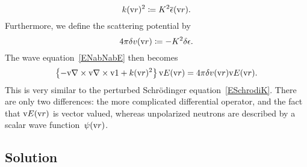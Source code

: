 \begin{equation}
  k(\text{v}{r})^2 \coloneqq K^2 \overline{\epsilon}(\text{v}{r}).
\end{equation}
Furthermore, we define the scattering potential by
%
\begin{equation}
  4\pi\delta v(\text{v}{r}) \coloneqq - K^2\delta\epsilon.
\end{equation}
The wave equation~\cref{ENabNabE} then becomes
\begin{equation}\label{EwaveE3}
  \left\{-\text{v}{\nabla}\times\text{v}{\nabla}\times\text{v}{1} + k(\text{v}{r})^2\right\}\text{v}{E}(\text{v}{r})
  = 4\pi\delta v(\text{v}{r})\text{v}{E}(\text{v}{r}).
\end{equation}
%
%
This is very similar to the perturbed Schrödinger equation~\cref{ESchrodiK}.
%
There are only two differences:
the more complicated differential operator,
and the fact that $\text{v}{E}(\text{v}{r})$ is vector valued,
whereas unpolarized neutrons are described by a scalar wave function~$\psi(\text{v}{r})$.

\subsection{Solution}\label{SXscasol}

\MissingSection

\iffalse
OLD MAT:
To simplify the left-hand side,
we make use of a standard vector analysis identity,
followed by an application of Gauss's law $\Nabla\v{D}=0$:
\index{Gauss's law}%
\begin{equation}
  \Nabla\times\Nabla\times\v{E}
  = - \Nabla^2\v{E} + \Nabla(\Nabla\v{E})
  = - \Nabla^2\v{E} - \Nabla\left[\eps(\r)^{-1}(\Nabla\v\eps(\r))\v{E}\right].
\end{equation}
When applied to propagating waves, the second term can be neglected against the first one.
This follows from a simple estimate:
For X-rays, the dielectric permittivity~$\eps$
\index{Dielectric permittivity}%
\index{Permittivity}%
deviates from the unit tensor by no more than $10^{-5}$.
All the more certainly, fluctuation amplitudes are no larger than $10^{-5}$.
In contrast, within half a wavelength, $\v{E}$ changes sign.
Therefore, $(\Nabla\eps)\v{E}$ is by at least five orders of magnitude
smaller than $\Nabla\v{E}$,
and can safely be neglected.
With this approximation, the wave equation~\cref{ENabNabE} becomes simply
\begin{equation}\label{EwaveE2}
  \Nabla^2\v{E}
  = -K^2\eps(\r)\v{E}.
\end{equation}
\fi

